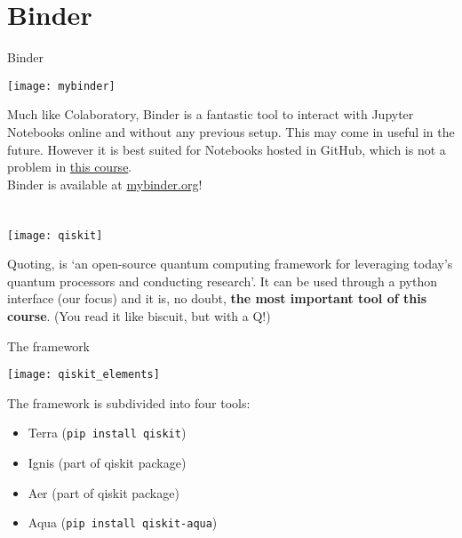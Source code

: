 \documentclass[aspectratio=43]{beamer}
\begin{document}
\section{Binder}
\begin{frame}{Binder}
    \begin{center}
	    \texttt{[image: mybinder]}
    \end{center}
    \begin{cardTiny}
        Much like Colaboratory, Binder is a fantastic tool to interact with Jupyter Notebooks online and without any previous setup. This may come in useful in the future. However it is best suited for Notebooks hosted in GitHub, which is not a problem in \href{\githubRepo}{this course}.\\
        Binder is available at \href{https://mybinder.org/}{mybinder.org}!
    \end{cardTiny}
\pagenumber
\end{frame}


\section{\qk}
\begin{frame}{\qk}
    \begin{center}
	    \texttt{[image: qiskit]}
    \end{center}
    \begin{cardTiny}
    Quoting, \qk is `an open-source quantum computing framework for leveraging today's quantum processors and conducting research'. It can be used through a python interface (our focus) and it is, no doubt, \textbf{the most important tool of this course}. (You read it like biscuit, but with a Q!)
    \end{cardTiny}
\pagenumber
\end{frame}


\begin{frame}{The \qk framework}
    \begin{center}
	    \texttt{[image: qiskit\_elements]}
    \end{center}
    \begin{cardTiny}
        \small{
        The \qk framework is subdivided into four tools:
        \footnotesize{
            \begin{itemize}
                \itemsep0em 
                \item \qk Terra (\texttt{pip install qiskit})
                \item \qk Ignis (part of qiskit package)
                \item \qk Aer (part of qiskit package)
                \item \qk Aqua  (\texttt{pip install qiskit-aqua})
            \end{itemize}
        }
        }
    \end{cardTiny}
\pagenumber
\end{frame}
\end{document}
